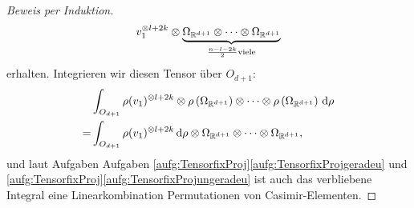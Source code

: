 \begin{proof}[Beweis per Induktion]
\begin{align*}
	v_1^{\otimes l+2k} \otimes \underbrace{\Omega_{\mathbb{R}^{d+1}} \otimes \cdots \otimes \Omega_{\mathbb{R}^{d+1}}}_{\frac{n-l-2k}{2} \text{viele}}
\end{align*}
erhalten. Integrieren wir diesen Tensor über $O_{d+1}$: 
\begin{align*}
	&\int_{O_{d+1}} \rho(v_1)^{\otimes l+2k} \otimes \rho\left(\Omega_{\mathbb{R}^{d+1}}\right) \otimes \cdots \otimes \rho\left(\Omega_{\mathbb{R}^{d+1}}\right)\,\textrm{d} \rho \\
	=& \int_{O_{d+1}} \rho(v_1)^{\otimes l+2k} \,\textrm{d} \rho \otimes \Omega_{\mathbb{R}^{d+1}} \otimes \cdots \otimes \Omega_{\mathbb{R}^{d+1}},
\end{align*}
und laut Aufgaben Aufgaben \ref{aufg:TensorfixProj}\ref{aufg:TensorfixProjgeradeu} und \ref{aufg:TensorfixProj}\ref{aufg:TensorfixProjungeradeu} ist auch das verbliebene Integral eine Linearkombination Permutationen von Casimir-Elementen.
\end{proof}

